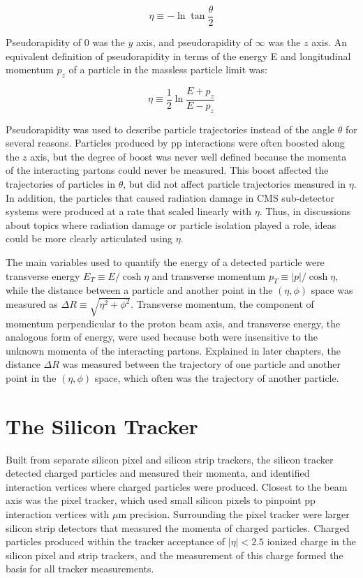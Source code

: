 \begin{equation}
	\eta \equiv -\ln{\tan{\frac{\theta}{2}}}
\end{equation}

Pseudorapidity of 0 was the $y$ axis, and pseudorapidity of $\infty$ was the $z$ axis.
An equivalent definition of pseudorapidity in terms of the energy E and longitudinal 
momentum $p_{z}$ of a particle in the massless particle limit was:

\begin{equation}
	\eta \equiv \frac{1}{2}\ln{\frac{E+p_{z}}{E-p_{z}}}
\end{equation}

Pseudorapidity was used to describe particle trajectories instead of the angle $\theta$ for several reasons.  Particles 
produced by pp interactions were often boosted along the $z$ axis, but the degree of boost was never well 
defined because the momenta of the interacting partons could never be measured.  This boost affected the 
trajectories of particles in $\theta$, but did not affect particle trajectories measured in $\eta$.  In 
addition, the particles that caused radiation damage in CMS sub-detector systems were produced at 
a rate that scaled linearly with $\eta$.  Thus, in discussions about topics where radiation damage 
or particle isolation played a role, ideas could be more clearly articulated using $\eta$.

The main variables used to quantify the energy of a detected particle were transverse energy 
$E_{T} \equiv E/\cosh{\eta}$ and transverse momentum $p_{T} \equiv |p|/\cosh{\eta}$, while the distance between 
a particle and another point in the $(\eta, \phi)$ space was measured as $\Delta R \equiv \sqrt{\eta^{2} + \phi^{2}}$.  
Transverse momentum, the component of momentum perpendicular to the proton beam axis, and transverse energy, the 
analogous form of energy, were used because both were insensitive to the unknown momenta of the interacting partons.  
Explained in later chapters, the distance $\Delta R$ was measured between the trajectory of one particle 
and another point in the $(\eta, \phi)$ space, which often was the trajectory of another particle.

\section{The Silicon Tracker}
\label{sec:siTrackerDescription}
Built from separate silicon pixel and silicon strip trackers, the silicon tracker detected charged particles  
and measured their momenta, and identified interaction vertices where charged particles were produced.  Closest 
to the beam axis was the pixel tracker, which used small silicon pixels to pinpoint pp interaction vertices 
with $\mu$m precision.  Surrounding the pixel tracker were larger silicon strip detectors that measured the 
momenta of charged particles.  Charged particles produced within the tracker acceptance of $|\eta| < 2.5$ ionized 
charge in the silicon pixel and strip trackers, and the measurement of this charge formed the basis for all tracker 
measurements.

